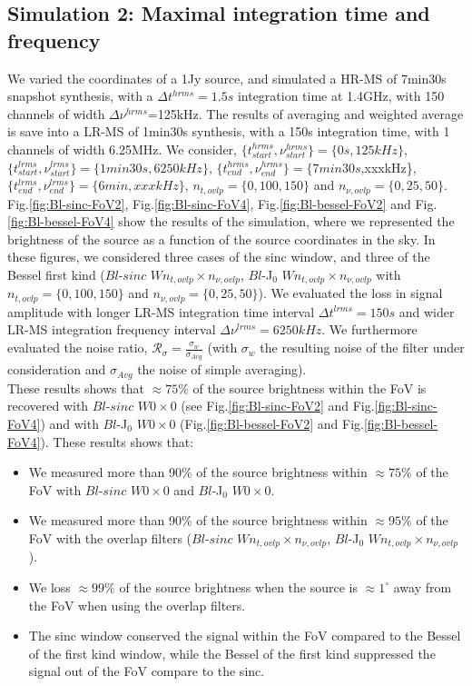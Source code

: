 \documentclass[useAMS,usenatbib]{mn2e}
\begin{document}
\subsection{Simulation 2: Maximal integration time and frequency}
We varied the coordinates of a 1Jy source, and simulated a HR-MS of 7min30s snapshot synthesis, with a $\Delta t^{hrms}=1.5s$ integration 
time at 1.4GHz,  with 150 channels of width $\Delta \nu^{hrms}$=125kHz. The results of averaging and weighted average is save into a LR-MS 
of 1min30s synthesis, with a 150s integration time,  with 1 channels of width 6.25MHz. We consider, 
$\{t^{hrms}_{start},\nu^{hrms}_{start}\}=\{0s,125kHz\}$, $\{t^{lrms}_{start},\nu^{lrms}_{start}\}=\{1min30s,6250kHz\}$, 
$\{t^{hrms}_{end},\nu^{hrms}_{end}\}=\{7min30s$,xxxkHz\}, $\{t^{lrms}_{end},\nu^{lrms}_{end}\}=\{6min,xxxkHz\}$, $n_{t,ovlp}=\{0,100,150\}$ 
and $n_{\nu,ovlp}=\{0,25,50\}$.\\
Fig.\ref{fig:Bl-sinc-FoV2}, Fig.\ref{fig:Bl-sinc-FoV4}, Fig.\ref{fig:Bl-bessel-FoV2} and Fig.\ref{fig:Bl-bessel-FoV4} show the results of 
the simulation, where we represented the brightness of the source as a function of the source coordinates in the sky. In these figures, we 
considered three cases of the sinc window, and three of the Bessel first kind ($Bl$-$sinc$ $W n_{t,ovlp} \times n_{\nu,ovlp}$, $Bl$-J$_0$ 
$W n_{t,ovlp} \times n_{\nu,ovlp}$ with  $n_{t,ovlp}=\{0,100,150\}$ and $n_{\nu,ovlp}=\{0,25,50\}$). We evaluated the loss in signal 
amplitude with longer LR-MS integration time interval $\Delta t^{lrms}=150s$ and wider LR-MS integration frequency interval $\Delta 
\nu^{lrms}=6250kHz$. We furthermore evaluated the  noise ratio, $\mathcal{R}_{\sigma}=\frac{\sigma_{w}}{\sigma_{Avg}}$ (with $\sigma_{w}$  
the resulting noise of the filter under consideration and $\sigma_{Avg}$ the noise of simple averaging).\\
These results shows that $\approx 75\%$  of the source brightness within the FoV is recovered with $Bl$-$sinc$ $W0 
\times 0$ (see Fig.\ref{fig:Bl-sinc-FoV2} and Fig.\ref{fig:Bl-sinc-FoV4}) and with $Bl$-J$_0$ $W0\times0$ (Fig.\ref{fig:Bl-bessel-FoV2} and 
Fig.\ref{fig:Bl-bessel-FoV4}). These results shows that:
\begin{itemize}
 \item We measured more than 90\% of the source brightness within $\approx 75\%$ of the FoV with $Bl$-$sinc$ $W0 \times 0$ and 
      $Bl$-J$_0$ $W0\times0$. 
 \item We measured more than 90\% of the source brightness within $\approx 95\%$ of the FoV with the overlap filters ($Bl$-$sinc$ 
     $W n_{t,ovlp} \times n_{\nu,ovlp}$, $Bl$-J$_0$ $W n_{t,ovlp} \times n_{\nu,ovlp}$).
 \item We loss $\approx 99\%$ of the source brightness when the source is $\approx 1^{\circ}$ away from the FoV when using the overlap 
filters.
  \item The sinc window conserved the signal within the FoV compared to the Bessel of the first kind window, while the Bessel of the first 
kind suppressed the signal out of the FoV compare to the sinc.
\end{itemize}
\end{document}
